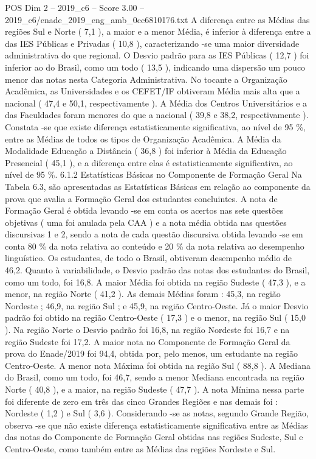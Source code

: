 \begin{textsample}{POS Dim 2 – 2019\_c6 – Score 3.00 – 2019\_c6/enade\_2019\_eng\_amb\_0cc6810176.txt}
A diferença entre as Médias das regiões Sul e Norte ( 7,1 ), a maior e a menor Média, é inferior à diferença entre a das IES Públicas e Privadas ( 10,8 ), caracterizando -se uma maior diversidade administrativa do que regional.
O Desvio padrão para as IES Públicas ( 12,7 ) foi inferior ao do Brasil, como um todo ( 13,5 ), indicando uma dispersão um pouco menor das notas nesta Categoria Administrativa.
No tocante a Organização Acadêmica, as Universidades e os CEFET/IF obtiveram Média mais alta que a nacional ( 47,4 e 50,1, respectivamente ).
A Média dos Centros Universitários e a das Faculdades foram menores do que a nacional ( 39,8 e 38,2, respectivamente ).
Constata -se que existe diferença estatisticamente significativa, ao nível de 95 \%, entre as Médias de todos os tipos de Organização Acadêmica.
A Média da Modalidade Educação a Distância ( 36,8 ) foi inferior à Média da Educação Presencial ( 45,1 ), e a diferença entre elas é estatisticamente significativa, ao nível de 95 \%. 6.1.2 Estatísticas Básicas no Componente de Formação Geral Na Tabela 6.3, são apresentadas as Estatísticas Básicas em relação ao componente da prova que avalia a Formação Geral dos estudantes concluintes.
A nota de Formação Geral é obtida levando -se em conta os acertos nas sete questões objetivas ( uma foi anulada pela CAA ) e a nota média obtida nas questões discursivas 1 e 2, sendo a nota de cada questão discursiva obtida levando -se em conta 80 \% da nota relativa ao conteúdo e 20 \% da nota relativa ao desempenho linguístico.
Os estudantes, de todo o Brasil, obtiveram desempenho médio de 46,2.
Quanto à variabilidade, o Desvio padrão das notas dos estudantes do Brasil, como um todo, foi 16,8.
A maior Média foi obtida na região Sudeste ( 47,3 ), e a menor, na região Norte ( 41,2 ).
As demais Médias foram : 45,3, na região Nordeste ; 46,9, na região Sul ; e 45,9, na região Centro-Oeste.
Já o maior Desvio padrão foi obtido na região Centro-Oeste ( 17,3 ) e o menor, na região Sul ( 15,0 ).
Na região Norte o Desvio padrão foi 16,8, na região Nordeste foi 16,7 e na região Sudeste foi 17,2.
A maior nota no Componente de Formação Geral da prova do Enade/2019 foi 94,4, obtida por, pelo menos, um estudante na região Centro-Oeste.
A menor nota Máxima foi obtida na região Sul ( 88,8 ).
A Mediana do Brasil, como um todo, foi 46,7, sendo a menor Mediana encontrada na região Norte ( 40,8 ), e a maior, na região Sudeste ( 47,7 ).
A nota Mínima nessa parte foi diferente de zero em três das cinco Grandes Regiões e nas demais foi : Nordeste ( 1,2 ) e Sul ( 3,6 ).
Considerando -se as notas, segundo Grande Região, observa -se que não existe diferença estatisticamente significativa entre as Médias das notas do Componente de Formação Geral obtidas nas regiões Sudeste, Sul e Centro-Oeste, como também entre as Médias das regiões Nordeste e Sul.

\end{textsample}
